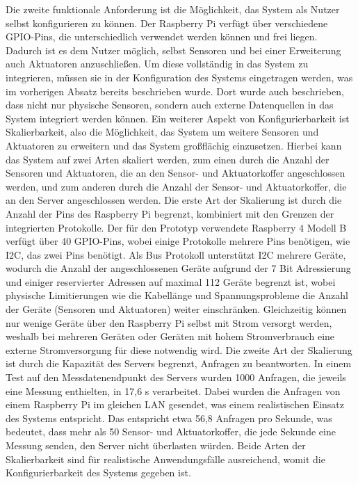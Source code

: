 Die zweite funktionale Anforderung ist die Möglichkeit, das System als Nutzer selbst konfigurieren zu können.
Der Raspberry Pi verfügt über verschiedene GPIO-Pins, die unterschiedlich verwendet werden können und frei liegen.
Dadurch ist es dem Nutzer möglich, selbst Sensoren und bei einer Erweiterung auch Aktuatoren anzuschließen.
Um diese vollständig in das System zu integrieren, müssen sie in der Konfiguration des Systems eingetragen werden, was im vorherigen Absatz bereits beschrieben wurde.
Dort wurde auch beschrieben, dass nicht nur physische Sensoren, sondern auch externe Datenquellen in das System integriert werden können.
Ein weiterer Aspekt von Konfigurierbarkeit ist Skalierbarkeit, also die Möglichkeit, das System um weitere Sensoren und Aktuatoren zu erweitern und das System großflächig einzusetzen.
Hierbei kann das System auf zwei Arten skaliert werden, zum einen durch die Anzahl der Sensoren und Aktuatoren, die an den Sensor- und Aktuatorkoffer angeschlossen werden, und zum anderen durch die Anzahl der Sensor- und Aktuatorkoffer, die an den Server angeschlossen werden.
Die erste Art der Skalierung ist durch die Anzahl der Pins des Raspberry Pi begrenzt, kombiniert mit den Grenzen der integrierten Protokolle.
Der für den Prototyp verwendete Raspberry 4 Modell B verfügt über 40 GPIO-Pins, wobei einige Protokolle mehrere Pins benötigen, wie I2C, das zwei Pins benötigt.
Als Bus Protokoll unterstützt I2C mehrere Geräte, wodurch die Anzahl der angeschlossenen Geräte aufgrund der 7 Bit Adressierung und einiger reservierter Adressen auf maximal 112 Geräte begrenzt ist, wobei physische Limitierungen wie die Kabellänge und Spannungsprobleme die Anzahl der Geräte (Sensoren und Aktuatoren) weiter einschränken.
Gleichzeitig können nur wenige Geräte über den Raspberry Pi selbst mit Strom versorgt werden, weshalb bei mehreren Geräten oder Geräten mit hohem Stromverbrauch eine externe Stromversorgung für diese notwendig wird.
Die zweite Art der Skalierung ist durch die Kapazität des Servers begrenzt, Anfragen zu beantworten.
In einem Test auf den Messdatenendpunkt des Servers wurden 1000 Anfragen, die jeweils eine Messung enthielten, in 17,6 s verarbeitet.
Dabei wurden die Anfragen von einem Raspberry Pi im gleichen LAN gesendet, was einem realistischen Einsatz des Systems entspricht.
Das entspricht etwa 56,8 Anfragen pro Sekunde, was bedeutet, dass mehr als 50 Sensor- und Aktuatorkoffer, die jede Sekunde eine Messung senden, den Server nicht überlasten würden.
Beide Arten der Skalierbarkeit sind für realistische Anwendungsfälle ausreichend, womit die Konfigurierbarkeit des Systems gegeben ist.

